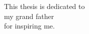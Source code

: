\begin{dedication}
This thesis is dedicated to\\
 my grand father\\
for inspiring me.\\
\end{dedication}
